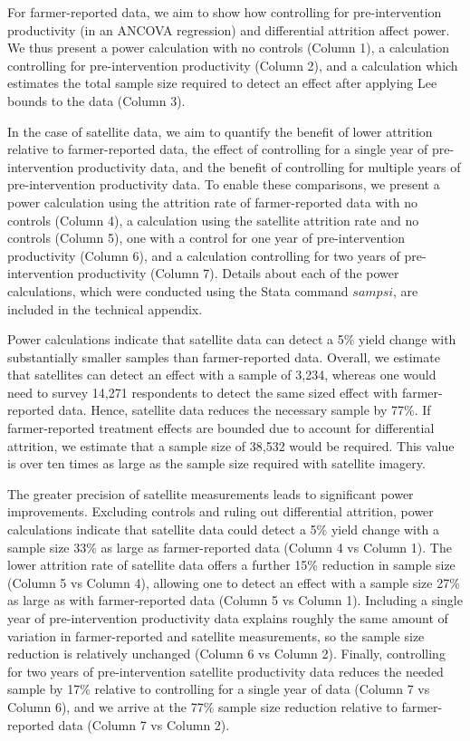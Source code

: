 \documentclass{article}
\begin{document}
For farmer-reported data, we aim to show how controlling for pre-intervention productivity (in an ANCOVA regression) and differential attrition affect power. We thus present a power calculation with no controls (Column 1), a calculation controlling for pre-intervention productivity (Column 2), and a calculation which estimates the total sample size required to detect an effect after applying Lee bounds to the data (Column 3). 

In the case of satellite data, we aim to quantify the benefit of lower attrition relative to farmer-reported data, the effect of controlling for a single year of pre-intervention productivity data, and the benefit of controlling for multiple years of pre-intervention productivity data. To enable these comparisons, we present a power calculation using the attrition rate of farmer-reported data with no controls (Column 4), a calculation using the satellite attrition rate and no controls (Column 5), one with a control for one year of pre-intervention productivity (Column 6), and a calculation controlling for two years of pre-intervention productivity (Column 7). Details about each of the power calculations, which were conducted using the Stata command $sampsi$, are included in the technical appendix. 

Power calculations indicate that satellite data can detect a 5\% yield change with substantially smaller samples than farmer-reported data. Overall, we estimate that satellites can detect an effect with a sample of 3,234, whereas one would need to survey 14,271 respondents to detect the same sized effect with farmer-reported data. Hence, satellite data reduces the necessary sample by 77\%. If farmer-reported treatment effects are bounded due to account for differential attrition, we estimate that a sample size of 38,532 would be required. This value is over ten times as large as the sample size required with satellite imagery. 

The greater precision of satellite measurements leads to significant power improvements. Excluding controls and ruling out differential attrition, power calculations indicate that satellite data could detect a 5\% yield change with a sample size 33\% as large as farmer-reported data (Column 4 vs Column 1). The lower attrition rate of satellite data offers a further 15\% reduction in sample size (Column 5 vs Column 4), allowing one to detect an effect with a sample size 27\% as large as with farmer-reported data (Column 5 vs Column 1). Including a single year of pre-intervention productivity data explains roughly the same amount of variation in farmer-reported and satellite measurements, so the sample size reduction is relatively unchanged (Column 6 vs Column 2). Finally, controlling for two years of pre-intervention satellite productivity data reduces the needed sample by 17\% relative to controlling for a single year of data (Column 7 vs Column 6), and we arrive at the 77\% sample size reduction relative to farmer-reported data (Column 7 vs Column 2). 
\end{document}
